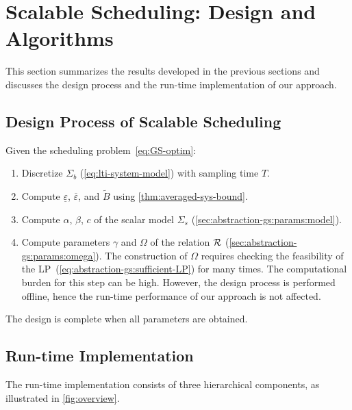 \section{Scalable Scheduling: Design and Algorithms}
\label{sec:summary}

This section summarizes the results developed in the previous sections and discusses the design process and the run-time implementation of our approach.

\subsection{Design Process of Scalable Scheduling}
\label{sec:summary:design}

Given the scheduling problem~\eqref{eq:GS-optim}:
\begin{enumerate}
\item Discretize %
  $\Sigma_{b}$ (\cref{eq:lti-system-model}) with sampling time $T$.
\item Compute $\underline{\varepsilon}$, $\overbar{\varepsilon}$, and $\tilde{B}$ %
  using \cref{thm:averaged-sys-bound}.
\item Compute %
  $\alpha$, $\beta$, $c$ of the scalar model $\Sigma_{s}$ (\cref{sec:abstraction-gs:params:model}).
\item Compute parameters $\gamma$ and $\Omega$ of the relation $\mathcal{R}$ (\cref{sec:abstraction-gs:params:omega}).  The construction of $\Omega$ requires checking the feasibility of the LP~(\ref{eq:abstraction-gs:sufficient-LP}) for many times.
The computational burden for this step can be high.  However, the design process is performed offline, hence %
the run-time performance of our approach is not affected.
\end{enumerate}
The design is complete when all parameters are obtained.

\subsection{Run-time Implementation}
\label{sec:summary:implementation}

The run-time implementation consists of three hierarchical components, as illustrated in \cref{fig:overview}.

